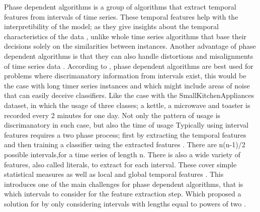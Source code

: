 Phase dependent algorithms is a group of algorithms that extract temporal features from intervals of time series.
These temporal features help with the interpretibility of the model; as they give insights about the temporal characteristics of the data \cite{baydogan2016time},
unlike whole time series algorithms that base their decisions solely on the similarities between instances.
Another advantage of phase dependent algorithms is that they can also handle distortions and misalignments of time series data \cite{deng2013time}.\newline
According to \cite{bagnall2017great}, phase dependent algorithms are best used for problems where discrimanatory information from intervals exist,
this would be the case with long timer series instances and which might include areas of noise that can easily deceive classifiers.
Like the case with the SmallKitchenAppliances dataset, in which the usage of three classes; a kettle, a microwave and toaster is recorded every 2 minutes for one day.
Not only the pattern of usage is discrimanatory in such case, but also the time of usage \newline
Typically using interval features requires a two phase process; first by extracting the temporal features and then training a classifier using the extracted features \cite{deng2013time}.
There are n(n-1)/2 possible intervals,for a time series of length n\cite{bagnall2017great}.
There is also a wide variety of features, also called literals, to extract for each interval. These cover simple statistical measures as well as local and global temporal features \cite{santos2016literature,rodriguez2004support,deng2013time}.
This introduces one of the main challenges for phase dependent algorithms, that is which intervals to consider for the feature extraction step.
Which \cite{rodriguez2004support} proposed a solution for by only considering intervals with lengths equal to powers of two \cite{bagnall2017great}.
